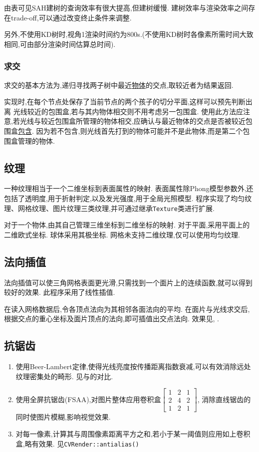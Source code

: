 由表可见SAH建树的查询效率有很大提高,但建树缓慢. 建树效率与渲染效率之间存在trade-off,可以通过改变终止条件来调整.

另外,不使用KD树时,视角1渲染时间约为800s.(不使用KD树时各像素所需时间大致相同,可由部分渲染时间估算总时间).

\subsubsection{求交}
求交的基本方法为,递归寻找两子树中最近\underline{物体}的交点,取较近者为结果返回.

实现时,在每个节点处保存了当前节点的两个孩子的切分平面,这样可以预先判断出离
光线较近的包围盒,若与其内物体相交则不用考虑另一包围盒.
使用此方法应注意,若光线与较近包围盒所管理的物体相交,应确认与最近物体的交点是否被较近包围盒\underline{包含}.
因为若不包含,则光线首先打到的物体可能并不是此物体,而是第二个包围盒管理的物体.

\subsection{纹理}
一种纹理相当于一个二维坐标到表面属性的映射.
表面属性除Phong模型参数外,还包括了透明度,用于折射判定,以及发光强度,用于全局光照模型.
程序实现了均匀纹理、网格纹理、图片纹理三类纹理,并可通过继承\verb|Texture|类进行扩展.

对于一个物体,由其自己管理三维坐标到二维坐标的映射.
对于平面,采用平面上的二维欧式坐标. 球体采用其极坐标.
网格未支持二维纹理,仅可以使用均匀纹理.

\subsection{法向插值}
\label{sec:smooth}
法向插值可以使三角网格表面更光滑,只需找到一个面片上的连续函数,就可以得到较好的效果.
此程序采用了线性插值.

在读入网格数据后,令各顶点法向为其相邻各面法向的平均.
在面片与光线求交后,根据交点的重心坐标及面片顶点的法向,即可插值出交点法向.
效果见, .

\subsection{抗锯齿}
\begin{enumerate}
  \item 使用Beer-Lambert定律\cite{beer},使得光线亮度按传播距离指数衰减,可以有效消除远处纹理密集处的畸形.
    见与的对比.

  \item 使用全屏抗锯齿(FSAA),对图片整体应用卷积盒$\begin{bmatrix}1 & 2 & 1\\2 & 4 & 2\\1 & 2 & 1\end{bmatrix} $,
    消除直线锯齿的同时使图片模糊,影响视觉效果.

  \item 对每一像素,计算其与周围像素距离平方之和,若小于某一阈值则应用如上卷积盒,略有效果. 见\verb|CVRender::antialias()|
\end{enumerate}

